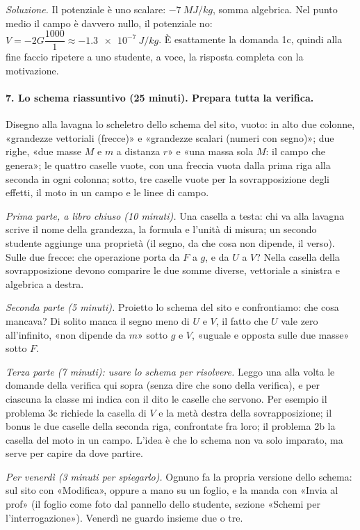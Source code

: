 \documentclass[11pt]{report}
\begin{document}
\emph{Soluzione.} Il potenziale è uno scalare: $\SI{-7}{MJ/kg}$, somma
algebrica. Nel punto medio il campo è davvero nullo, il potenziale no:
$V = -2G\dfrac{1000}{1} \approx \SI{-1.3e-7}{J/kg}$. È esattamente la
domanda 1c, quindi alla fine faccio ripetere a uno studente, a voce, la
risposta completa con la motivazione.

\paragraph{7. Lo schema riassuntivo (25 minuti). Prepara tutta la verifica.}
Disegno alla lavagna lo scheletro dello schema del sito, vuoto: in alto
due colonne, «grandezze vettoriali (frecce)» e «grandezze scalari (numeri
con segno)»; due righe, «due masse $M$ e $m$ a distanza $r$» e «una massa
sola $M$: il campo che genera»; le quattro caselle vuote, con una freccia
vuota dalla prima riga alla seconda in ogni colonna; sotto, tre caselle
vuote per la sovrapposizione degli effetti, il moto in un campo e le linee
di campo.

\emph{Prima parte, a libro chiuso (10 minuti).} Una casella a testa: chi
va alla lavagna scrive il nome della grandezza, la formula e l'unità di
misura; un secondo studente aggiunge una proprietà (il segno, da che cosa
non dipende, il verso). Sulle due frecce: che operazione porta da $F$ a
$g$, e da $U$ a $V$? Nella casella della sovrapposizione devono comparire
le due somme diverse, vettoriale a sinistra e algebrica a destra.

\emph{Seconda parte (5 minuti).} Proietto lo schema del sito e
confrontiamo: che cosa mancava? Di solito manca il segno meno di $U$ e
$V$, il fatto che $U$ vale zero all'infinito, «non dipende da $m$» sotto
$g$ e $V$, «uguale e opposta sulle due masse» sotto $F$.

\emph{Terza parte (7 minuti): usare lo schema per risolvere.} Leggo una
alla volta le domande della verifica qui sopra (senza dire che sono della
verifica), e per ciascuna la classe mi indica con il dito le caselle che
servono. Per esempio il problema 3c richiede la casella di $V$ e la metà
destra della sovrapposizione; il bonus le due caselle della seconda riga,
confrontate fra loro; il problema 2b la casella del moto in un campo.
L'idea è che lo schema non va solo imparato, ma serve per capire da dove
partire.

\emph{Per venerdì (3 minuti per spiegarlo).} Ognuno fa la propria versione
dello schema: sul sito con «Modifica», oppure a mano su un foglio, e la
manda con «Invia al prof» (il foglio come foto dal pannello dello studente, sezione
«Schemi per l'interrogazione»). Venerdì ne guardo insieme due o tre.
\end{document}

